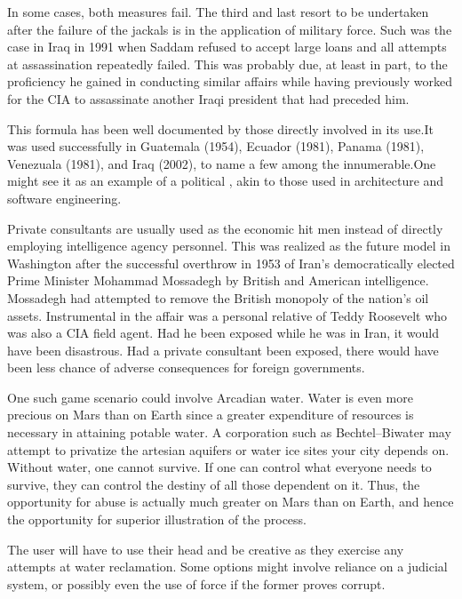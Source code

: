 In some cases, both measures fail. The third and last resort to be undertaken after the failure of the jackals is in the application of military force. Such was the case in Iraq in 1991 when Saddam refused to accept large loans and all attempts at assassination repeatedly failed. This was probably due, at least in part, to the proficiency he gained in conducting similar affairs while having previously worked for the CIA to assassinate another Iraqi president that had preceded him.

This formula has been well documented by those directly involved in its use.\footnotecite[perkins2005] It was used successfully in Guatemala (1954), Ecuador (1981), Panama (1981), Venezuala (1981), and Iraq (2002), to name a few among the innumerable. One might see it as an example of a political , akin to those used in architecture and software engineering.

Private consultants are usually used as the economic hit men instead of directly employing intelligence agency personnel. This was realized as the future model in Washington after the successful overthrow in 1953 of Iran's democratically elected Prime Minister Mohammad Mossadegh by British and American intelligence. Mossadegh had attempted to remove the British monopoly of the nation's oil assets. Instrumental in the affair was a personal relative of Teddy Roosevelt who was also a CIA field agent. Had he been exposed while he was in Iran, it would have been disastrous. Had a private consultant been exposed, there would have been less chance of adverse consequences for foreign governments.

One such game scenario could involve Arcadian water. Water is even more precious on Mars than on Earth since a greater expenditure of resources is necessary in attaining potable water. A corporation such as Bechtel--Biwater may attempt to privatize the artesian aquifers or water ice sites your city depends on. Without water, one cannot survive. If one can control what everyone needs to survive, they can control the destiny of all those dependent on it. Thus, the opportunity for abuse is actually much greater on Mars than on Earth, and hence the opportunity for superior illustration of the process.

The user will have to use their head and be creative as they exercise any attempts at water reclamation. Some options might involve reliance on a judicial system, or possibly even the use of force if the former proves corrupt.

